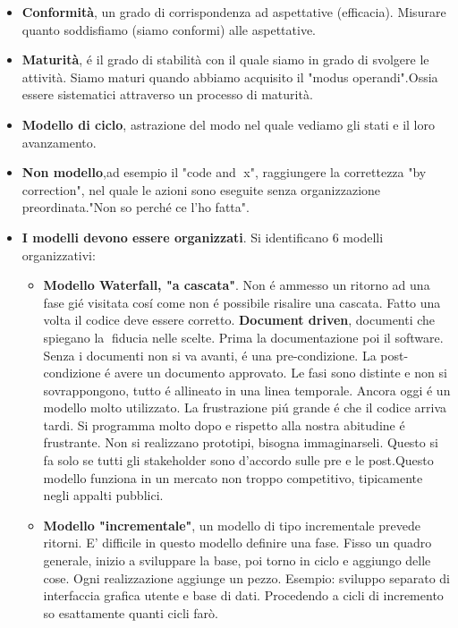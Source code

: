 \documentclass[a4paper,10pt] {article}
\begin{document}
\begin{itemize}
\begin{itemize}
	
	\item \textbf{Conformità}, un grado di corrispondenza ad aspettative 
	(efficacia). Misurare quanto soddisfiamo (siamo conformi) alle aspettative.
	
	\item \textbf{Maturità}, é il grado di stabilità con il quale siamo 
	in grado di svolgere le attività. Siamo maturi quando abbiamo acquisito 
	il "modus operandi".Ossia essere sistematici attraverso un processo di 
	maturità.
	
	\item \textbf{Modello di ciclo}, astrazione del modo nel quale vediamo gli 
	stati e il loro avanzamento.
	
	\item \textbf{Non modello},ad esempio il "code and x", raggiungere la 
	correttezza "by correction", nel quale le azioni sono eseguite senza 
	organizzazione preordinata."Non so perché ce l'ho fatta".
	
	\item \textbf{I modelli devono essere organizzati}. Si identificano 6 
	modelli organizzativi:
	\begin{itemize}
	\item  \textbf{Modello Waterfall, "a cascata"}. Non é ammesso un ritorno 
	ad una fase gié visitata cos\'i come non é possibile risalire una 
	cascata. Fatto una volta il codice deve essere corretto. 	
	\textbf{Document driven}, documenti che spiegano la fiducia nelle 
	scelte. Prima la documentazione poi il software. Senza i documenti
	non si va avanti, é una pre-condizione. La post-condizione é avere un 
	documento approvato. Le fasi sono distinte e non si sovrappongono, tutto 
	é allineato in una linea temporale. Ancora oggi é un modello
	molto utilizzato. La frustrazione pi\'u grande é che il codice arriva 
	tardi. Si programma molto dopo e rispetto alla nostra abitudine é 
	frustrante. Non si realizzano  prototipi, bisogna immaginarseli.
	Questo si fa solo se tutti gli stakeholder sono d'accordo sulle pre e le 
	post.Questo modello funziona in un mercato non troppo competitivo, 
	tipicamente negli appalti pubblici.


	\item \textbf{Modello "incrementale"}, un modello di tipo incrementale 
	prevede ritorni. E' difficile in questo modello definire una fase.
	Fisso un quadro generale, inizio a sviluppare la base, poi torno in ciclo e 
	aggiungo delle cose. Ogni realizzazione aggiunge un pezzo. Esempio: 
	sviluppo separato di interfaccia grafica utente e base di dati. Procedendo 
	a cicli di incremento so esattamente quanti cicli farò. 
	

\end{itemize}
\end{itemize}
\end{itemize}
\end{document}
